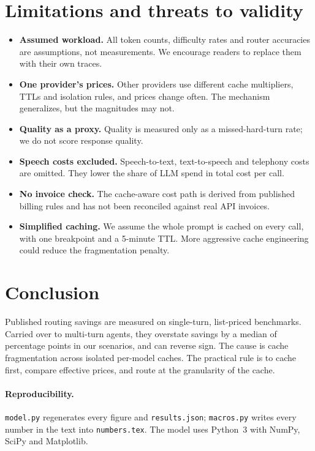 \documentclass[10pt]{article}
\begin{document}
\section{Limitations and threats to validity}
\begin{itemize}[leftmargin=*,itemsep=1pt]
\item \textbf{Assumed workload.} All token counts, difficulty rates and router accuracies are assumptions, not measurements. We encourage readers to replace them with their own traces.
\item \textbf{One provider's prices.} Other providers use different cache multipliers, TTLs and isolation rules, and prices change often. The mechanism generalizes, but the magnitudes may not.
\item \textbf{Quality as a proxy.} Quality is measured only as a missed-hard-turn rate; we do not score response quality.
\item \textbf{Speech costs excluded.} Speech-to-text, text-to-speech and telephony costs are omitted. They lower the share of LLM spend in total cost per call.
\item \textbf{No invoice check.} The cache-aware cost path is derived from published billing rules and has not been reconciled against real API invoices.
\item \textbf{Simplified caching.} We assume the whole prompt is cached on every call, with one breakpoint and a 5-minute TTL. More aggressive cache engineering could reduce the fragmentation penalty.
\end{itemize}

\section{Conclusion}
Published routing savings are measured on single-turn, list-priced benchmarks. Carried over to multi-turn agents, they overstate savings by a median of \mcGap{} percentage points in our scenarios, and can reverse sign. The cause is cache fragmentation across isolated per-model caches. The practical rule is to cache first, compare effective prices, and route at the granularity of the cache.

\paragraph{Reproducibility.} \texttt{model.py} regenerates every figure and \texttt{results.json}; \texttt{macros.py} writes every number in the text into \texttt{numbers.tex}. The model uses Python~3 with NumPy, SciPy and Matplotlib.
\end{document}
